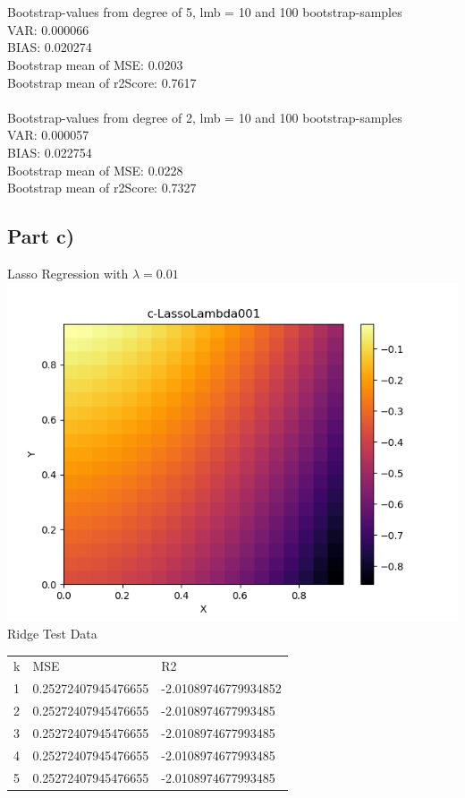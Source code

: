 \documentclass[a4paper,norsk]{article}
\begin{document}
\\
\\Bootstrap-values from degree of 5, lmb = 10 and 100 bootstrap-samples
\\VAR: 0.000066
\\BIAS: 0.020274
\\Bootstrap mean of MSE: 0.0203
\\Bootstrap mean of r2Score: 0.7617
\\
\\Bootstrap-values from degree of 2, lmb = 10 and 100 bootstrap-samples
\\VAR: 0.000057
\\BIAS: 0.022754
\\Bootstrap mean of MSE: 0.0228
\\Bootstrap mean of r2Score: 0.7327

\clearpage

\subsection{Part c)}
Lasso Regression with $\lambda = 0.01$
\\ \includegraphics[scale=.7]{c-LassoLambda001}
\\Ridge Test Data
\begin{table}[!h]
\begin{tabular}{lll}
k & MSE                   & R2                 \\
1 & 0.25272407945476655  & -2.01089746779934852 \\
2 & 0.25272407945476655  & -2.0108974677993485 \\
3 & 0.25272407945476655  & -2.0108974677993485 \\
4 & 0.25272407945476655  & -2.0108974677993485 \\
5 & 0.25272407945476655 & -2.0108974677993485
\end{tabular}
\end{table}
\end{document}
